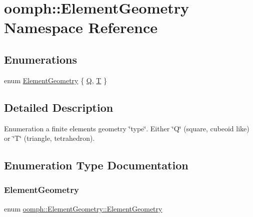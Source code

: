 \hypertarget{namespaceoomph_1_1ElementGeometry}{}\section{oomph\+:\+:Element\+Geometry Namespace Reference}
\label{namespaceoomph_1_1ElementGeometry}
\subsection*{Enumerations}
\begin{DoxyCompactItemize}
\item 
enum \hyperlink{namespaceoomph_1_1ElementGeometry_a86ff99972b0205d7524e294c58c1182a}{Element\+Geometry} \{ \hyperlink{namespaceoomph_1_1ElementGeometry_a86ff99972b0205d7524e294c58c1182aa950f376990cc80d475d36570d59f3ac3}{Q}, 
\hyperlink{namespaceoomph_1_1ElementGeometry_a86ff99972b0205d7524e294c58c1182aa9c3705b667836ab13e1b3b81a3eb28b8}{T}
 \}
\end{DoxyCompactItemize}


\subsection{Detailed Description}
Enumeration a finite element\textquotesingle{}s geometry \char`\"{}type\char`\"{}. Either \char`\"{}\+Q\char`\"{} (square, cubeoid like) or \char`\"{}\+T\char`\"{} (triangle, tetrahedron). 

\subsection{Enumeration Type Documentation}
\mbox{\label{namespaceoomph_1_1ElementGeometry_a86ff99972b0205d7524e294c58c1182a}} 
\subsubsection{\texorpdfstring{Element\+Geometry}{ElementGeometry}}
{\footnotesize\ttfamily enum \hyperlink{namespaceoomph_1_1ElementGeometry_a86ff99972b0205d7524e294c58c1182a}{oomph\+::\+Element\+Geometry\+::\+Element\+Geometry}}

